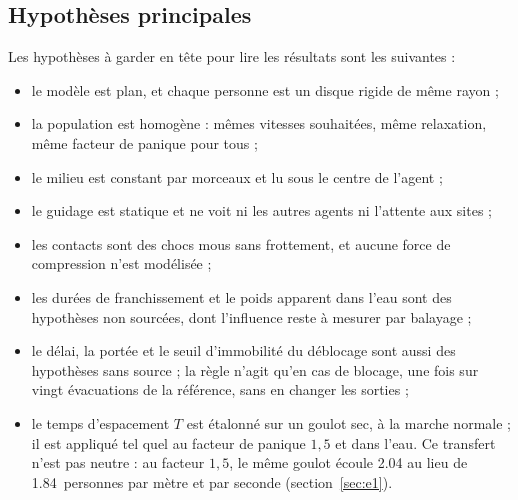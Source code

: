 \subsection{Hypothèses principales}

Les hypothèses à garder en tête pour lire les résultats sont les suivantes :
\begin{itemize}
\item le modèle est plan, et chaque personne est un disque rigide de même
  rayon ;
\item la population est homogène : mêmes vitesses souhaitées, même
  relaxation, même facteur de panique pour tous ;
\item le milieu est constant par morceaux et lu sous le centre de l'agent ;
\item le guidage est statique et ne voit ni les autres agents ni l'attente aux
  sites ;
\item les contacts sont des chocs mous sans frottement, et aucune force de
  compression n'est modélisée ;
\item les durées de franchissement et le poids apparent dans l'eau sont des
  hypothèses non sourcées, dont l'influence reste à mesurer par balayage ;
\item le délai, la portée et le seuil d'immobilité du déblocage sont aussi des
  hypothèses sans source ; la règle n'agit qu'en cas de blocage, une fois sur
  vingt évacuations de la référence, sans en changer les sorties ;
\item le temps d'espacement $T$ est étalonné sur un goulot sec, à la marche
  normale ; il est appliqué tel quel au facteur de panique $1{,}5$ et dans
  l'eau. Ce transfert n'est pas neutre : au facteur $1{,}5$, le même goulot
  écoule \num{2.04} au lieu de \num{1.84}~personnes par mètre et par seconde
  (section~\ref{sec:e1}).
\end{itemize}
